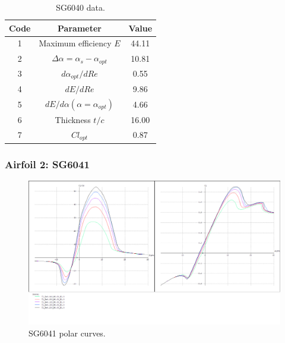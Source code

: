 \documentclass[../TFG_Annex.tex]{subfiles}
\begin{document}
\begin{table}[h!]
	\centering
	\begin{tabular}{c|c|c}
		Code & Parameter                                    & Value  \\ \hline
		1    & Maximum efficiency $E$                      &       44.11             \\
		2    & $\Delta \alpha=\alpha_{s}-\alpha_{opt}$    &            10.81         \\
		3    & ${d\alpha_{opt}}/{dRe}$                     &                0.55    \\
		4    & ${dE}/{dRe}$                                &          9.86          \\
		5    & ${dE}/{d \alpha} (\alpha=\alpha_{opt})$      &        4.66           \\
		6    & Thickness $t/c$                            &           16.00         \\
		7    & $Cl_{opt}$  & 0.87
	\end{tabular}
	\caption{SG6040 data.}
	\label{tab:Airf1}
\end{table}

\newpage

\subsubsection{Airfoil 2: SG6041}

\begin{figure}[h!]
	\centering
	\includegraphics[width=1\linewidth]{"../../04-Airfoil selection/Imatges airfoils/2-SG6041"}
	\caption{SG6041 polar curves.}
	\label{fig:2-sg6041}
\end{figure}
\end{document}
